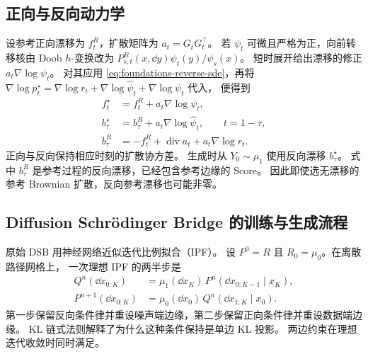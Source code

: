 \subsection{正向与反向动力学}

设参考正向漂移为 \(f^R_t\)，扩散矩阵为 \(a_t=G_tG_t^\top\)。
若 \(\psi_t\) 可微且严格为正，向前转移核由 Doob \(h\)-变换改为
\(P^R_{s,t}(x,\dd y)\psi_t(y)/\psi_s(x)\)。
短时展开给出漂移的修正 \(a_t\nabla\log\psi_t\)。
对其应用 \eqref{eq:foundations-reverse-sde}，再将
\(\nabla\log p_t^\star=
 \nabla\log r_t+\nabla\log\widehat\psi_t+\nabla\log\psi_t\) 代入，
便得到
\begin{equation}
  \begin{aligned}
  f_t^\star &= f_t^R+a_t\nabla\log\psi_t,\\
  b_\tau^\star
     &= b_\tau^R+a_t\nabla\log\widehat\psi_t,
         \qquad t=1-\tau,\\
  b_\tau^R &= -f_t^R+\operatorname{div}a_t+a_t\nabla\log r_t .
  \end{aligned}
  \label{eq:overview-sb-drifts}
\end{equation}
正向与反向保持相应时刻的扩散协方差。
生成时从 \(Y_0\sim\mu_1\) 使用反向漂移 \(b_\tau^\star\)。
式中 \(b_\tau^R\) 是参考过程的反向漂移，已经包含参考边缘的 Score。
因此即使选无漂移的参考 Brownian 扩散，反向参考漂移也可能非零。

\subsection{Diffusion Schrödinger Bridge 的训练与生成流程}

原始 DSB \cite{debortoli2021dsb} 用神经网络近似迭代比例拟合（IPF）。
设 \(P^0=R\) 且 \(R_0=\mu_0\)。在离散路径网格上，
一次理想 IPF 的两半步是
\begin{equation}
  \begin{aligned}
  Q^n(\dd x_{0:K})&=\mu_1(\dd x_K)\,P^n(\dd x_{0:K-1}\mid x_K),\\
  P^{n+1}(\dd x_{0:K})&=\mu_0(\dd x_0)\,Q^n(\dd x_{1:K}\mid x_0).
  \end{aligned}
  \label{eq:overview-dsb-ipf}
\end{equation}
第一步保留反向条件律并重设噪声端边缘，第二步保留正向条件律并重设数据端边缘。
KL 链式法则解释了为什么这种条件保持是单边 KL 投影。
两边约束在理想迭代收敛时同时满足。

